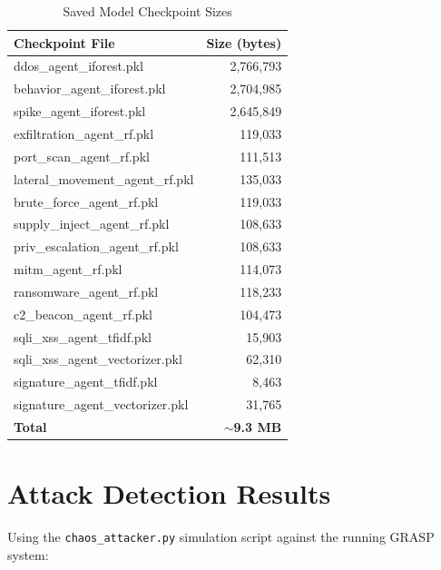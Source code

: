 \documentclass[12pt, a4paper]{report}
\begin{document}
\begin{table}[H]
\centering
\caption{Saved Model Checkpoint Sizes}
\label{tab:checkpoint_sizes}
\begin{tabular}{l r}
\toprule
\textbf{Checkpoint File} & \textbf{Size (bytes)} \\
\midrule
ddos\_agent\_iforest.pkl & 2,766,793 \\
behavior\_agent\_iforest.pkl & 2,704,985 \\
spike\_agent\_iforest.pkl & 2,645,849 \\
exfiltration\_agent\_rf.pkl & 119,033 \\
port\_scan\_agent\_rf.pkl & 111,513 \\
lateral\_movement\_agent\_rf.pkl & 135,033 \\
brute\_force\_agent\_rf.pkl & 119,033 \\
supply\_inject\_agent\_rf.pkl & 108,633 \\
priv\_escalation\_agent\_rf.pkl & 108,633 \\
mitm\_agent\_rf.pkl & 114,073 \\
ransomware\_agent\_rf.pkl & 118,233 \\
c2\_beacon\_agent\_rf.pkl & 104,473 \\
sqli\_xss\_agent\_tfidf.pkl & 15,903 \\
sqli\_xss\_agent\_vectorizer.pkl & 62,310 \\
signature\_agent\_tfidf.pkl & 8,463 \\
signature\_agent\_vectorizer.pkl & 31,765 \\
\midrule
\textbf{Total} & \textbf{$\sim$9.3 MB} \\
\bottomrule
\end{tabular}
\end{table}

\section{Attack Detection Results}

Using the \texttt{chaos\_attacker.py} simulation script against the running GRASP system:
\end{document}
